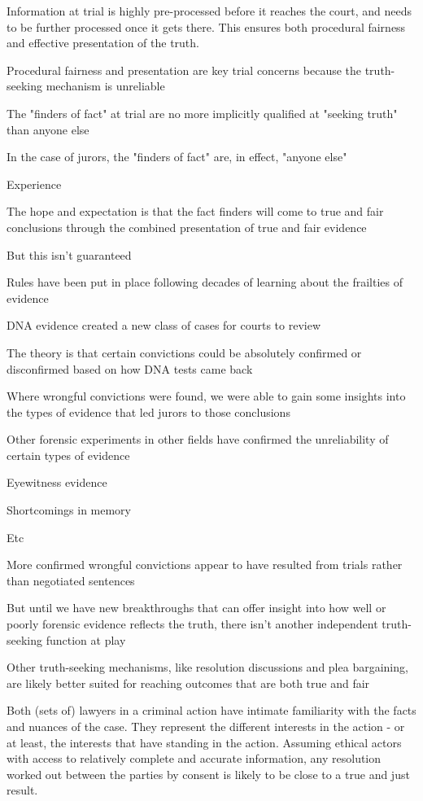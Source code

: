 Information at trial is highly pre-processed before it reaches the court, and needs to be further processed once it gets there. This ensures both procedural fairness and effective presentation of the truth.

Procedural fairness and presentation are key trial concerns because the truth-seeking mechanism is unreliable

The "finders of fact" at trial are no more implicitly qualified at "seeking truth" than anyone else

In the case of jurors, the "finders of fact" are, in effect, "anyone else"

Experience

The hope and expectation is that the fact finders will come to true and fair conclusions through the combined presentation of true and fair evidence

But this isn't guaranteed

Rules have been put in place following decades of learning about the frailties of evidence

DNA evidence created a new class of cases for courts to review

The theory is that certain convictions could be absolutely confirmed or disconfirmed based on how DNA tests came back

Where wrongful convictions were found, we were able to gain some insights into the types of evidence that led jurors to those conclusions

Other forensic experiments in other fields have confirmed the unreliability of certain types of evidence

Eyewitness evidence

Shortcomings in memory

Etc

More confirmed wrongful convictions appear to have resulted from trials rather than negotiated sentences

But until we have new breakthroughs that can offer insight into how well or poorly forensic evidence reflects the truth, there isn't another independent truth-seeking function at play

Other truth-seeking mechanisms, like resolution discussions and plea bargaining, are likely better suited for reaching outcomes that are both true and fair

Both (sets of) lawyers in a criminal action have intimate familiarity with the facts and nuances of the case. They represent the different interests in the action - or at least, the interests that have standing in the action. Assuming ethical actors with access to relatively complete and accurate information, any resolution worked out between the parties by consent is likely to be close to a true and just result.

